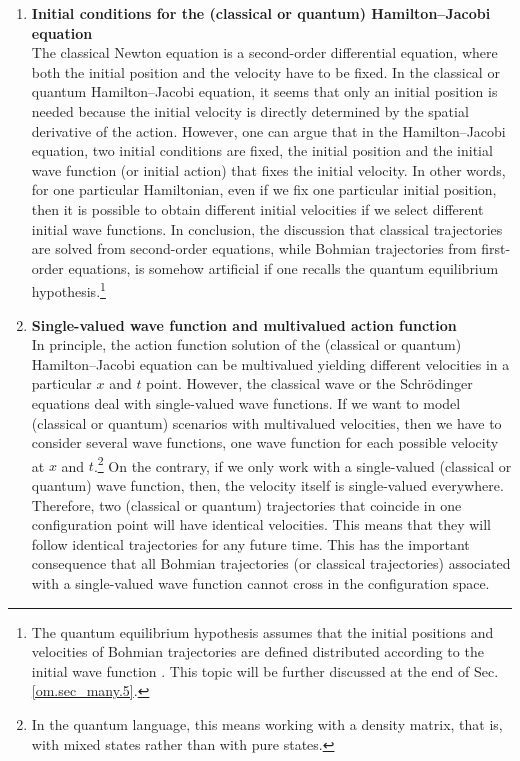 \documentclass[nofootinbib, secnumarabic, amsmath, nobibnotes,11pt,aps,pra, floatfix]{revtex4-1}
\newcommand{\sref}[1]{Sec. \ref{#1}}
\begin{document}
\begin{enumerate}
\begin{enumerate}
\item \textbf{Initial conditions for the (classical or quantum)  Hamilton--Jacobi equation} \\ The classical Newton equation is a second-order differential equation, where both the initial position and the velocity have to be fixed. In the classical or quantum Hamilton--Jacobi equation, it seems that only an initial position is needed because the initial velocity is directly determined by the spatial derivative of the action. However, one can argue that in the Hamilton--Jacobi equation, two initial conditions are fixed, the initial position and the initial wave function (or initial action) that fixes the initial velocity. In other words, for one particular Hamiltonian, even if we fix one particular initial position, then it is possible to obtain different initial velocities if we select different initial wave functions. In conclusion, the discussion that classical trajectories are solved from second-order equations, while Bohmian trajectories from first-order equations, is somehow artificial if one recalls the quantum equilibrium hypothesis.\footnote{The quantum equilibrium hypothesis assumes that the initial positions and velocities of Bohmian trajectories are defined distributed according to the initial wave function \cite{om.extra2,om.extra9,om.Valentini2006,om.nonequilibrium}. This topic will be further discussed at the end of \sref{om.sec_many.5}.}

\item \textbf{Single-valued wave function and multivalued action function} \\ In principle, the action function solution of the (classical or quantum) Hamilton--Jacobi equation can be multivalued yielding different velocities in a particular $x$ and $t$ point. However, the classical wave or the Schr\"odinger equations deal with single-valued wave functions. If we want to model (classical or quantum) scenarios with multivalued velocities, then we have to consider several wave functions, one wave function for each possible velocity at $x$ and $t$.\footnote{In the quantum language, this means working with a density matrix, that is, with mixed states rather than with pure states.} On the contrary, if we only work with a single-valued (classical or quantum) wave function, then, the velocity itself is single-valued everywhere. Therefore, two (classical or quantum) trajectories that coincide in one configuration point will have identical velocities. This means that they will follow identical trajectories for any future time. This has the important consequence that all Bohmian trajectories (or classical trajectories) associated with a single-valued wave function cannot cross in the configuration space.
\end{enumerate}

\end{enumerate}
\end{document}
